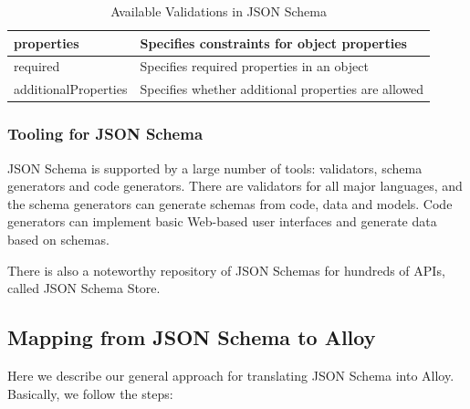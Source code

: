 \begin{table}[h!]
\begin{tabular}{|l|p{10cm}|}
		\hline
		properties                  & Specifies constraints for object properties                                   \\
		\hline
		required                    & Specifies required properties in an object                                    \\
		\hline
		additionalProperties        & Specifies whether additional properties are allowed                           \\
		\hline
	\end{tabular}
\caption{Available Validations in JSON Schema}
\label{tab:json-schema-validation-keywords}
\end{table}
  
\subsubsection{Tooling for JSON Schema}

JSON Schema is supported by a large number of tools\cite{jsonschemaImplementations}: validators, schema generators and code generators. There are validators for all major languages, and the schema generators can generate schemas from code, data and models. Code generators can implement basic Web-based user interfaces and generate data based on schemas.

There is also a noteworthy repository of JSON Schemas for hundreds of APIs, called JSON Schema Store\cite{schemastoreJSONSchema}.

\subsection{Mapping from JSON Schema to Alloy}

Here we describe our general approach for translating JSON Schema into Alloy. Basically, we follow the steps:

